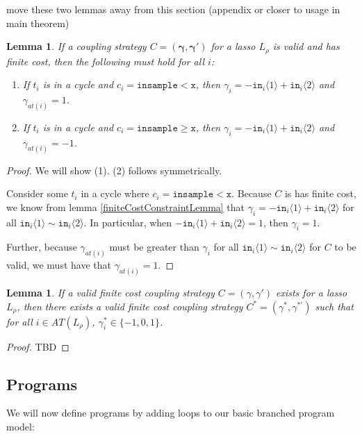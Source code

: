 \documentclass[12pt]{article}
\newcommand{\gguard}[1][x]{\texttt{insample}\geq #1}
\newcommand{\lguard}[1][x]{\texttt{insample} < #1}
\newcommand{\brangle}[1]{\langle #1 \rangle}
\newtheorem{lemma}[thm]{Lemma}
\theoremstyle{definition}
\begin{document}
{\color{red} move these two lemmas away from this section (appendix or closer to usage in main theorem)}

\begin{lemma}\label{cycleGammaConstraints}
    If a coupling strategy $C=(\mathbf{\gamma}, \mathbf{\gamma}')$ for a lasso $L_\rho$ is valid and has finite cost, then the following must hold for all $i$:
    \begin{enumerate}
        \item If $t_i$ is in a cycle and $c_i = \lguard[\texttt{x}]$, then $\gamma_i = -\texttt{in}_i\brangle{1}+\texttt{in}_i\brangle{2}$ and $\gamma_{at(i)} = 1$.
        \item If $t_i$ is in a cycle and $c_i = \gguard[\texttt{x}]$, then $\gamma_i = -\texttt{in}_i\brangle{1}+\texttt{in}_i\brangle{2}$ and $\gamma_{at(i)} = -1$.
    \end{enumerate}
\end{lemma}
\begin{proof}
    We will show (1). (2) follows symmetrically.

    Consider some $t_i$ in a cycle where $c_i = \lguard[\texttt{x}]$. Because $C$ is has finite cost, we know from lemma \ref{finiteCostConstraintLemma} that $\gamma_i = -\texttt{in}_i\brangle{1}+\texttt{in}_i\brangle{2}$ for all  $\texttt{in}_i\brangle{1}\sim\texttt{in}_i\brangle{2}$. In particular, when $-\texttt{in}_i\brangle{1}+\texttt{in}_i\brangle{2}=1$, then $\gamma_i=1$. 
    
    Further, because $\gamma_{at(i)}$ must be greater than $\gamma_i$ for all $\texttt{in}_i\brangle{1}\sim\texttt{in}_i\brangle{2}$ for $C$ to be valid, we must have that $\gamma_{at(i)}=1$.
\end{proof}
\begin{lemma}
    If a valid finite cost coupling strategy $C = (\gamma, \gamma')$ exists for a lasso $L_\rho$, then there exists a valid finite cost coupling strategy $C^*= (\gamma^*, \gamma^{*\prime})$ such that for all $i\in AT(L_\rho)$, $\gamma_i^*\in \{-1, 0, 1\}$. 
\end{lemma}
\begin{proof}
    TBD
\end{proof}

\subsection{Programs}

We will now define programs by adding loops to our basic branched program model: 
\end{document}
